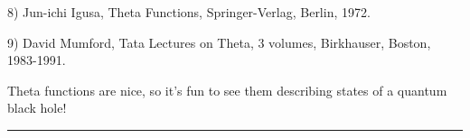 8) Jun-ichi Igusa, Theta Functions, Springer-Verlag, Berlin, 1972.

9) David Mumford, Tata Lectures on Theta, 3 volumes, Birkhauser, Boston,
1983-1991.

Theta functions are nice, so it's fun to see them describing states of a
quantum black hole!



 \par\noindent\rule{\textwidth}{0.4pt}

